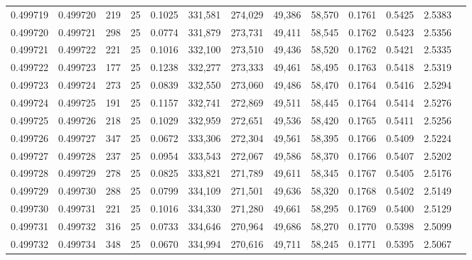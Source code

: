 \begin{tabular}{rrrrrrrrrrrrr}
0.499719 & 0.499720 & 219 &  25 &                                     0.1025 & 331,581 & 274,029 &  49,386 &  58,570 & 0.1761 & 0.5425 & 2.5383 \\
0.499720 & 0.499721 & 298 &  25 &                                     0.0774 & 331,879 & 273,731 &  49,411 &  58,545 & 0.1762 & 0.5423 & 2.5356 \\
0.499721 & 0.499722 & 221 &  25 &                                     0.1016 & 332,100 & 273,510 &  49,436 &  58,520 & 0.1762 & 0.5421 & 2.5335 \\
0.499722 & 0.499723 & 177 &  25 &                                     0.1238 & 332,277 & 273,333 &  49,461 &  58,495 & 0.1763 & 0.5418 & 2.5319 \\
0.499723 & 0.499724 & 273 &  25 &                                     0.0839 & 332,550 & 273,060 &  49,486 &  58,470 & 0.1764 & 0.5416 & 2.5294 \\
0.499724 & 0.499725 & 191 &  25 &                                     0.1157 & 332,741 & 272,869 &  49,511 &  58,445 & 0.1764 & 0.5414 & 2.5276 \\
0.499725 & 0.499726 & 218 &  25 &                                     0.1029 & 332,959 & 272,651 &  49,536 &  58,420 & 0.1765 & 0.5411 & 2.5256 \\
0.499726 & 0.499727 & 347 &  25 &                                     0.0672 & 333,306 & 272,304 &  49,561 &  58,395 & 0.1766 & 0.5409 & 2.5224 \\
0.499727 & 0.499728 & 237 &  25 &                                     0.0954 & 333,543 & 272,067 &  49,586 &  58,370 & 0.1766 & 0.5407 & 2.5202 \\
0.499728 & 0.499729 & 278 &  25 &                                     0.0825 & 333,821 & 271,789 &  49,611 &  58,345 & 0.1767 & 0.5405 & 2.5176 \\
0.499729 & 0.499730 & 288 &  25 &                                     0.0799 & 334,109 & 271,501 &  49,636 &  58,320 & 0.1768 & 0.5402 & 2.5149 \\
0.499730 & 0.499731 & 221 &  25 &                                     0.1016 & 334,330 & 271,280 &  49,661 &  58,295 & 0.1769 & 0.5400 & 2.5129 \\
0.499731 & 0.499732 & 316 &  25 &                                     0.0733 & 334,646 & 270,964 &  49,686 &  58,270 & 0.1770 & 0.5398 & 2.5099 \\
0.499732 & 0.499734 & 348 &  25 &                                     0.0670 & 334,994 & 270,616 &  49,711 &  58,245 & 0.1771 & 0.5395 & 2.5067 \\

\end{tabular}
